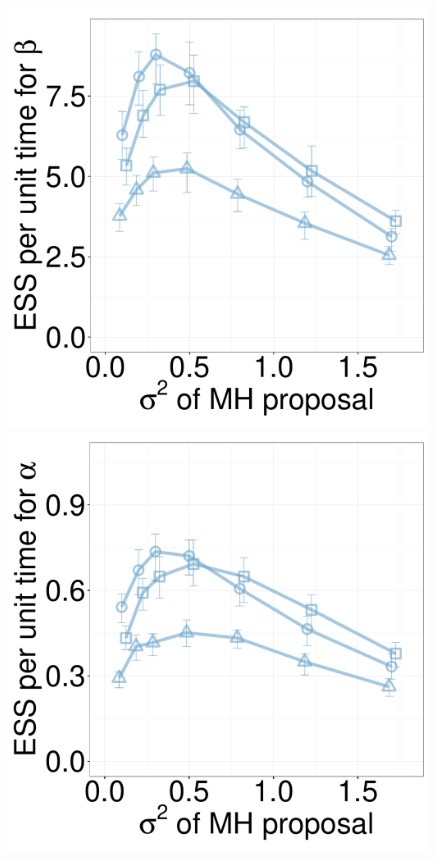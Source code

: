 \begin{figure}[H]
\begin{minipage}[hp]{0.24\linewidth}
    \includegraphics [width=0.99\textwidth, angle=0]{figs/new_whole_exp_figs/mh_q_beta_dim3.pdf}
	\end{minipage}
  \begin{minipage}[hp]{0.24\linewidth}
  \centering
    \includegraphics [width=0.99\textwidth, angle=0]{figs/new_whole_exp_figs/mh_q_alpha_dim10.pdf}

\end{minipage}
\end{figure}
